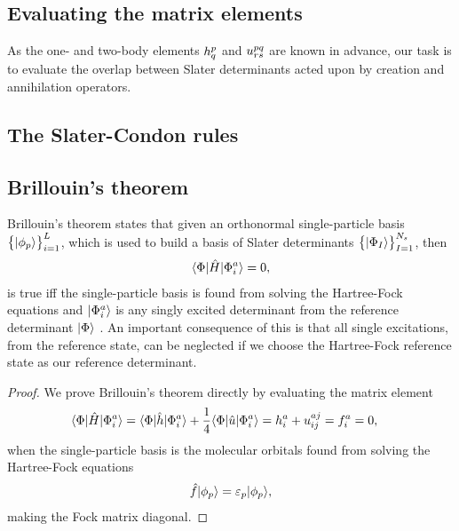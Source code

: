         \subsection{Evaluating the matrix elements}
            As the one- and two-body elements $h^{p}_{q}$ and
            $u^{pq}_{rs}$ are known in advance, our task is to evaluate
            the overlap between Slater determinants acted upon by creation and
            annihilation operators.

        \subsection{The Slater-Condon rules}

        \subsection{Brillouin's theorem}
            Brillouin's theorem states that given an orthonormal single-particle
            basis $\left\{ | \phi_p \rangle \right\}_{i = 1}^{L}$, which is used to build a basis of
            Slater determinants $\left\{ | \Phi_I \rangle \right\}_{I = 1}^{N_s}$, then
            \begin{align}
                \langle \Phi |\hat{H}| \Phi^{a}_{i} \rangle = 0,
            \end{align}
            is true iff the single-particle basis is found from solving the
            Hartree-Fock equations and $| \Phi^{a}_{i} \rangle$ is any singly
            excited determinant from the reference determinant $| \Phi \rangle$
            \cite{kvaal2017notes}.
            An important consequence of this is that all single excitations,
            from the reference state, can be neglected if we choose the
            Hartree-Fock reference state as our reference determinant.
            \begin{proof}
                We prove Brillouin's theorem directly by evaluating the matrix
                element
                \begin{align}
                    \langle \Phi |\hat{H}| \Phi^{a}_{i} \rangle
                    &= \langle \Phi |\hat{h}| \Phi^{a}_{i} \rangle
                    + \frac{1}{4}\langle \Phi |\hat{u}| \Phi^{a}_{i} \rangle
                    = h^{a}_{i} + u^{aj}_{ij}
                    = f^{a}_{i} = 0,
                \end{align}
                when the single-particle basis is the molecular orbitals found
                from solving the Hartree-Fock equations
                \begin{align}
                    \hat{f}| \phi_p \rangle = \varepsilon_p| \phi_p \rangle,
                \end{align}
                making the Fock matrix diagonal.
            \end{proof}

